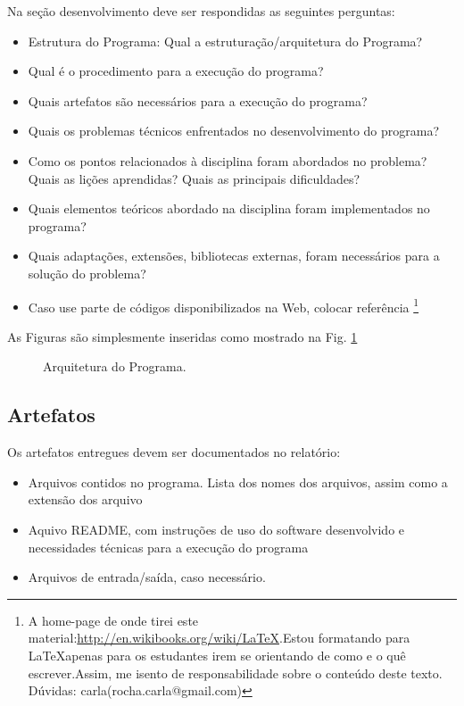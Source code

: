 Na seção desenvolvimento deve ser respondidas as seguintes perguntas:
 
	\begin{itemize}
		\item Estrutura do Programa: Qual a estruturação/arquitetura do Programa?
	 	\item Qual é o procedimento para a execução do programa? 
	 	\item Quais artefatos são necessários para a execução do programa?
	 	\item Quais os problemas técnicos enfrentados no desenvolvimento do programa?
	 	\item Como os pontos relacionados à disciplina foram abordados no problema? Quais as lições aprendidas? Quais as principais dificuldades?
	 	\item Quais elementos teóricos abordado na disciplina foram implementados no programa?
	 	\item Quais adaptações, extensões, bibliotecas externas, foram necessários para a solução do problema?
	 	\item Caso use parte de códigos disponibilizados na Web, colocar referência \footnote{A home-page de onde tirei
este material:\url{http://en.wikibooks.org/wiki/LaTeX}.Estou formatando para \LaTeX apenas para os estudantes irem se orientando de como e o quê escrever.Assim, me isento de responsabilidade sobre o conteúdo deste texto. Dúvidas: carla(rocha.carla@gmail.com)}
	\end{itemize}
	
	As Figuras são simplesmente inseridas como mostrado na Fig. \ref{Fig1}
	
\begin{figure}[ht]
  \centering
   \caption{Arquitetura do Programa.}
  \label{Fig1}
\end{figure}
 
\subsection{Artefatos}
\label{SebSec:Artefatos}
Os artefatos entregues devem ser documentados no relatório:
\begin{itemize}
\item Arquivos contidos no programa. Lista dos nomes dos arquivos, assim como a extensão dos arquivo
\item Aquivo README, com instruções de uso do software desenvolvido e necessidades técnicas para a execução do programa
\item Arquivos de entrada/saída, caso necessário.
\end{itemize}

